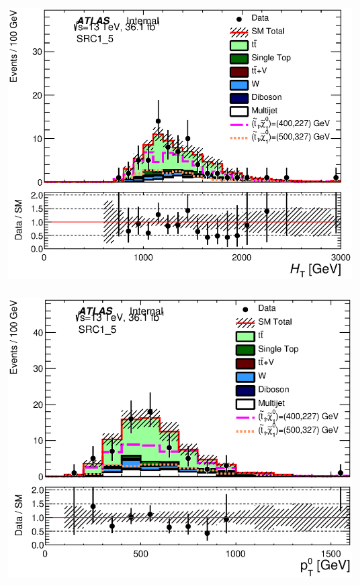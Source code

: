 \begin{figure}[h!]
\begin{center}
    \begin{subfigure}[b]{0.40\textwidth}    
    	 \includegraphics[width=\textwidth]{figures/plotRegion/Ht_SRC1_5.eps}
                \caption{ }
    \end{subfigure}
    \begin{subfigure}[b]{0.40\textwidth}    
    	 \includegraphics[width=\textwidth]{figures/plotRegion/JetPt_0__SRC1_5.eps}
                \caption{ }
    \end{subfigure}
    \begin{subfigure}[b]{0.40\textwidth}    

\end{subfigure}
\end{center}
\end{figure}
